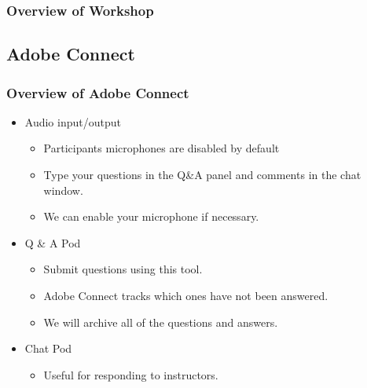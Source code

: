 \documentclass{beamer}
\begin{document}
\begin{frame}
  \frametitle{Overview of Workshop}
  
  

\end{frame}


\subsection{Adobe Connect}

\begin{frame}
  \frametitle{Overview of Adobe Connect}
 
  \begin{itemize}
  \item Audio input/output
    \begin{itemize}
    \item Participants microphones are disabled by default
    \item Type your questions in the Q\&A panel and comments in the
      chat window.
    \item We can enable your microphone if necessary.
    \end{itemize} 
  \item Q \& A Pod
    \begin{itemize}
    \item Submit questions using this tool.
    \item Adobe Connect tracks which ones have not been answered.
    \item We will archive all of the questions and answers.
    \end{itemize}
  \item Chat Pod
    \begin{itemize}
    \item Useful for responding to instructors.
    \end{itemize}
  \end{itemize}

\end{frame}
\end{document}
